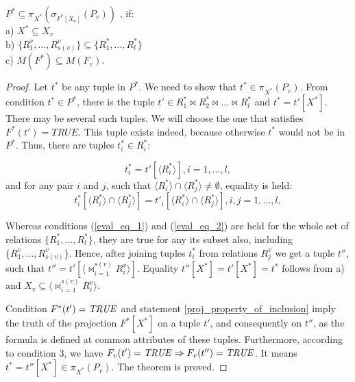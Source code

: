 \begin{theorem}
$P^{\ast} \subseteq \pi_{X^{\ast}} (\sigma_{F^{\ast}[X_v]} (P_{v}))$
, if:
\\a) $X^{\ast} \subseteq X_{v}$
\\b) 
$ \{R^{v}_{1}, \ldots, R^{v}_{s(v)}\}
\subseteq
\{R^{\ast}_{1}, \ldots, R^{\ast}_{l}\} $
\\c) $M (F^{\ast}) \subseteq M (F_{v}) $.
\label{th_base}
\end{theorem} 
\begin{proof}
Let $t^{\ast}$ be any tuple in $P^{\ast}$. We need to show that
$t^{\ast} \in \pi_{X^{\ast}} (P_{v})$. From condition  $t^{\ast} \in P^{\ast}$,
there is the tuple $t' \in R^{\ast}_1 \Join R^{\ast}_2\Join\ldots
\Join R^{\ast}_l$ and $t^{\ast} = t'[X^{\ast}]$. There may be several such tuples. We will choose the one that satisfies $F^{\ast}(t')=TRUE$.
This tuple exists indeed, because otherwise $t^{\ast}$ would not be in $P^{\ast}$. Thus, there are tuples
$t^{\ast}_i \in R^{\ast}_i$:

\begin{equation}
t^{\ast}_i = t'[\langle R^{\ast}_i\rangle], i = 1,\dots,l,
\label{eval_eq_1}
\end{equation}
\def \intersecij {\langle R^{\ast}_i \rangle \cap \langle R^{\ast}_j \rangle}
and for any pair $i$ and $j$, such that  $\intersecij \neq \emptyset$, equality is held:
\begin{equation}
t^{\ast}_i[\intersecij] = t'_i[\intersecij], i,j = 1,\dots,l,
\label{eval_eq_2}
\end{equation}

Whereas conditions (\ref{eval_eq_1}) and (\ref{eval_eq_2}) are held for the
whole set of relations $\{R^{\ast}_{1}, \ldots, R^{\ast}_{l}\}$, they are
true for any its subset also, including $\{R^{v}_{1}, \ldots, R^{v}_{s(v)}\}$.
Hence, after joining tuples $t^{\ast}_i$ from relations $R^{v}_j$ we get a tuple
$t''$, such that $t'' = t'[\langle {\Join}_{i=1}^{s(v)} R^v_i \rangle]$.
Equality $t''[X^{\ast}] = t'[X^{\ast}] = t^{\ast}$ follows from a) and $X_v
\subseteq \langle {\Join}_{i=1}^{s(v)} R^v_i \rangle$.

Condition  $F^{\ast}(t') = \mathit{TRUE}$ and statement 
\ref{proj_property_of_inclusion} imply the truth of the projection $F^{\ast}
[X^{\ast}]$ on a tuple $t'$, and consequently on $t''$, as the formula is defined at common attributes of these tuples. Furthermore, according to condition 3, we have $F_v (t') = \mathit{TRUE} \Rightarrow F_v (t'') = \mathit{TRUE}$.
It means $t^{\ast} = t''[X^{\ast}] \in \pi_{X^{\ast}} (P_{v})$. The theorem is
proved.
\end{proof}

